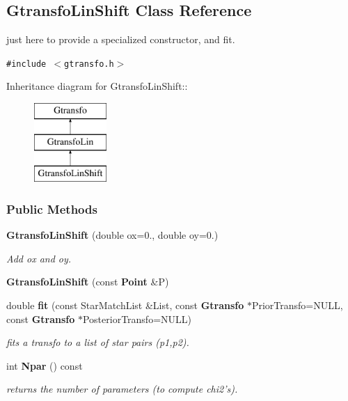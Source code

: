 \subsection{Gtransfo\-Lin\-Shift  Class Reference}
\label{class_gtransfolinshift}
just here to provide a specialized constructor, and fit. 


{\tt \#include $<$gtransfo.h$>$}

Inheritance diagram for Gtransfo\-Lin\-Shift::\begin{figure}[H]
\begin{center}
\leavevmode
\includegraphics[height=3cm]{class_gtransfolinshift}
\end{center}
\end{figure}
\subsubsection*{Public Methods}
\begin{CompactItemize}
\item 
{}
{\bf Gtransfo\-Lin\-Shift} (double ox=0., double oy=0.)\label{class_gtransfolinshift_a0}

\begin{CompactList}\small\item\em Add ox and oy.\item\end{CompactList}\item 
{}
{\bf Gtransfo\-Lin\-Shift} (const {\bf Point} \&P)\label{class_gtransfolinshift_a1}

\item 
double {\bf fit} (const Star\-Match\-List \&List, const {\bf Gtransfo} $\ast$Prior\-Transfo=NULL, const {\bf Gtransfo} $\ast$Posterior\-Transfo=NULL)
\begin{CompactList}\small\item\em fits a transfo to a list of star pairs (p1,p2).\item\end{CompactList}\item 
{}
int {\bf Npar} () const\label{class_gtransfolinshift_a3}

\begin{CompactList}\small\item\em returns the number of parameters (to compute chi2's).\item\end{CompactList}\end{CompactItemize}


